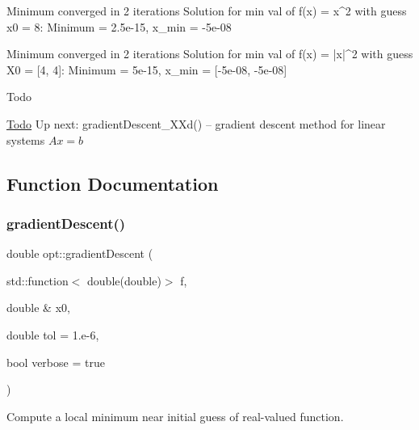 \begin{DoxyCode}
Minimum converged in 2 iterations
Solution for min val of f(x) = x^2 with guess x0 = 8:
    Minimum = 2.5e-15, x\_min = -5e-08

Minimum converged in 2 iterations
Solution for min val of f(x) = |x|^2 with guess X0 = [4, 4]:
    Minimum = 5e-15, x\_min = [-5e-08, -5e-08]
\end{DoxyCode}
 \begin{DoxyRefDesc}{Todo}
\item[\mbox{\hyperlink{todo__todo000001}{Todo}}]Up next\+: gradient\+Descent\+\_\+\+X\+Xd() -- gradient descent method for linear systems $Ax=b$ \end{DoxyRefDesc}


\subsection{Function Documentation}
\mbox{\label{namespaceopt_af1ef2e32062af31429ae74fc07c57fb0}} 
\subsubsection{\texorpdfstring{gradient\+Descent()}{gradientDescent()}}
{\footnotesize\ttfamily double opt\+::gradient\+Descent (\begin{DoxyParamCaption}\item[{std\+::function$<$ double(double)$>$}]{f,  }\item[{double \&}]{x0,  }\item[{double}]{tol = {\ttfamily 1.e-\/6},  }\item[{bool}]{verbose = {\ttfamily true} }\end{DoxyParamCaption})}



Compute a local minimum near initial guess of real-\/valued function. 

